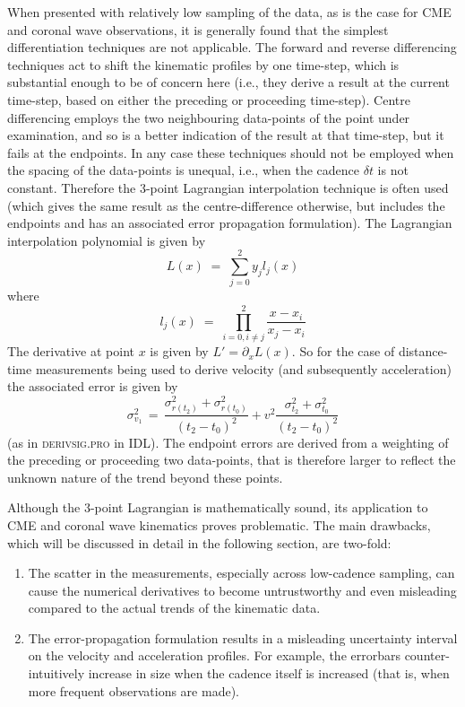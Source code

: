 \documentclass[structabstract]{aa}
\begin{document}
When presented with relatively low sampling of the data, as is the case for CME and coronal wave observations, it is generally found that the simplest differentiation techniques are not applicable. The forward and reverse differencing techniques act to shift the kinematic profiles by one time-step, which is substantial enough to be of concern here (i.e., they derive a result at the current time-step, based on either the preceding or  proceeding time-step). Centre differencing employs the two neighbouring data-points of the point under examination, and so is a better indication of the result at that time-step, but it fails at the endpoints. In any case these techniques should not be employed when the spacing of the data-points is unequal, i.e., when the cadence $\delta t$ is not constant. Therefore the 3-point Lagrangian interpolation technique is often used (which gives the same result as the centre-difference otherwise, but includes the endpoints and has an associated error propagation formulation). The Lagrangian interpolation polynomial is given by
\begin{equation}
L(x) \; =\; \sum_{j=0}^2 y_j l_j(x) 
\end{equation}
where
\begin{equation}
l_j(x) \; =\; \prod_{i=0, i\neq j}^2 \frac{x-x_i}{x_j-x_i} 
\end{equation}
The derivative at point $x$ is given by $L'=\partial_x L(x)$. So for the case of distance-time measurements being used to derive velocity (and subsequently acceleration) the associated error is given by
\begin{equation}
\sigma_{v_1}^2 \,=\, \frac{\sigma_{r(t_2)}^2+\sigma_{r(t_0)}^2}{(t_2-t_0)^2} + v^2 \frac{\sigma_{t_2}^2+\sigma_{t_0}^2}{(t_2-t_0)^2}
\label{vel_err}
\end{equation}
(as in \textsc{derivsig.pro} in IDL). The endpoint errors are derived from a weighting of the preceding or proceeding two data-points, that is therefore larger to reflect the unknown nature of the trend beyond these points.

Although the 3-point Lagrangian is mathematically sound, its application to CME and coronal wave kinematics proves problematic. The main drawbacks, which will be discussed in detail in the following section, are two-fold:
\begin{enumerate}
\item The scatter in the measurements, especially across low-cadence sampling, can cause the numerical derivatives to become untrustworthy and even misleading compared to the actual trends of the kinematic data.
\item The error-propagation formulation results in a misleading uncertainty interval on the velocity and acceleration profiles. For example, the errorbars counter-intuitively increase in size when the cadence itself is increased (that is, when more frequent observations are made).
\end{enumerate}
\end{document}
